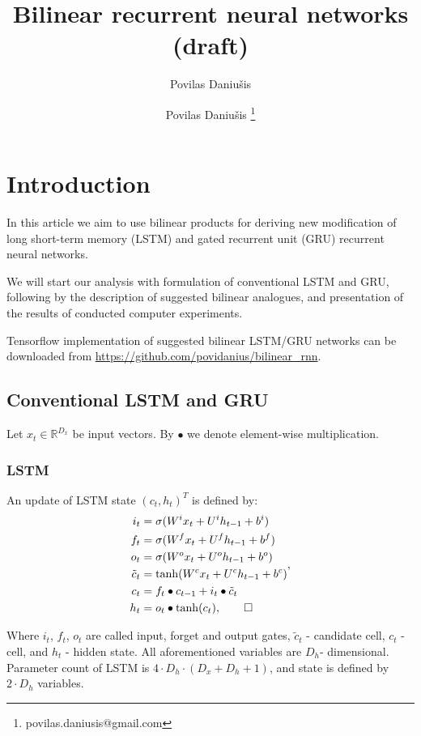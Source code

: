 \documentclass[a4paper,11pt]{article}
\author{Povilas Daniu\v{s}is}
\author[1]{Povilas Daniu\v{s}is \thanks{povilas.daniusis@gmail.com}}
\title{Bilinear recurrent neural networks (draft)}
\begin{document}
\maketitle
\section{Introduction}

In this article we aim to use bilinear products for deriving new modification of long short-term memory (LSTM) \cite{Hochreiter} and gated 
recurrent unit (GRU) \cite{Chung} recurrent neural networks.

We will start our analysis with formulation of conventional LSTM and GRU, following by the description of 
suggested bilinear analogues, and presentation of the results of conducted computer experiments.

Tensorflow \cite{Tensorflow} implementation of suggested bilinear LSTM/GRU networks can be 
downloaded from \url{https://github.com/povidanius/bilinear_rnn}.




\subsection{Conventional LSTM and GRU}

Let $x_{t} \in \mathbb{R}^{D_{x}}$ be input vectors. By $\bullet$ we denote element-wise multiplication. 

\subsubsection{LSTM}

An update of LSTM state $(c_{t}, h_{t})^{T}$ is defined by:
\begin{align}
\begin{split}
\label{LSTM}
i_{t} &=\sigma(W^{i}x_{t} + U^{i}h_{t-1} + b^{i})\\
f_{t} &=\sigma(W^{f}x_{t} + U^{f}h_{t-1} + b^{f})\\
o_{t} &=\sigma(W^{o}x_{t} + U^{o}h_{t-1} + b^{o})\\
\tilde{c}_{t} &= \tanh(W^{c}x_{t} + U^{c}h_{t-1} + b^{c})\\
c_{t} &=f_{t} \bullet c_{t-1} + i_{t} \bullet \tilde{c}_{t}\\
h_{t} &=o_{t} \bullet \tanh(c_{t}), \qedhere
\end{split},
\end{align}

Where $i_{t}$, $f_{t}$, $o_{t}$ are called input, forget and output gates, $\tilde{c}_{t}$ - candidate cell, $c_{t}$ - cell, and $h_{t}$ - hidden state. All aforementioned variables are $D_{h}$- dimensional. Parameter count of LSTM is 
$4 \cdot D_{h} \cdot (D_{x}  + D_{h} + 1)$, and state is defined by $2 \cdot D_{h}$ variables.
\end{document}
